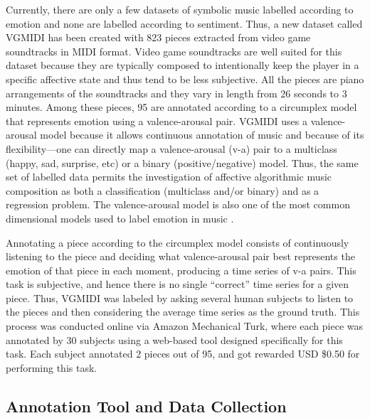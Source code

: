Currently, there are only a few datasets of symbolic music labelled according to emotion \cite{madhok2018sentimozart, tan2020automated, zhao2019emotional} and none are labelled according to sentiment. Thus, a new dataset called VGMIDI has been created with 823 pieces extracted from video game soundtracks in MIDI format. Video game soundtracks are well suited for this dataset because they are typically composed to intentionally keep the player in a specific affective state and thus tend to be less subjective. All the pieces are piano arrangements of the soundtracks and they vary in length from 26 seconds to 3 minutes. Among these pieces, 95 are annotated according to a circumplex model that represents emotion using a valence-arousal pair. VGMIDI uses a valence-arousal model because it allows continuous annotation of music and because of its flexibility---one can directly map a valence-arousal (v-a) pair to a multiclass (happy, sad, surprise, etc) or a binary (positive/negative) model. Thus, the same set of labelled data permits the investigation of affective algorithmic music composition as both a classification (multiclass and/or binary) and as a regression problem. The valence-arousal model is also one of the most common dimensional models used to label emotion in music \cite{Soleymani_2013}.

Annotating a piece according to the circumplex model consists of continuously listening to the piece and deciding what valence-arousal pair best represents the emotion of that piece in each moment, producing a time series of v-a pairs. This task is subjective, and hence there is no single ``correct'' time series for a given piece. Thus, VGMIDI  was labeled by asking several human subjects to listen to the pieces and then considering the average time series as the ground truth. This process was conducted online via Amazon Mechanical Turk, where each piece was annotated by 30 subjects using a web-based tool designed specifically for this task. Each subject annotated 2 pieces out of 95, and got rewarded USD \$0.50 for performing this task.

\subsection{Annotation Tool and Data Collection}
\label{sec:data_collection}

